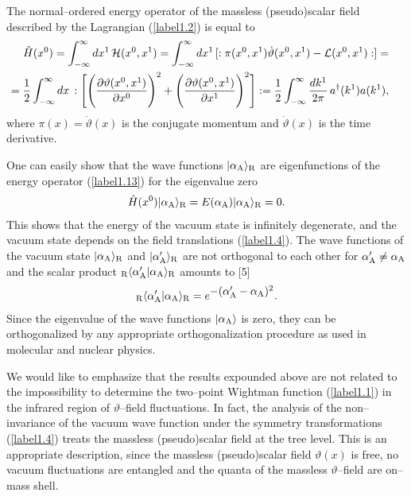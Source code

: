 \documentclass[a4paper,12pt] {article}
\begin{document}
%
The normal--ordered energy operator of the massless (pseudo)scalar
field described by the Lagrangian (\ref{label1.2}) is equal to
%
\begin{eqnarray}\label{label1.13}
\hspace{-0.3in}&&\hat{H}(x^0) = \int^{\infty}_{-\infty}dx^1\,{\cal
H}(x^0,x^1)
=\int^{\infty}_{-\infty}dx^1\,[:\pi(x^0,x^1)\dot{\vartheta}(x^0,x^1)
- {\cal L}(x^0,x^1):] = \nonumber\\ \hspace{-0.3in}&&=
\frac{1}{2}\int^{\infty}_{-\infty}dx\,:\Bigg[\Bigg(\frac{\partial
\vartheta(x^0,x^1)}{\partial x^0}\Bigg)^2 + \Bigg(\frac{\partial
\vartheta(x^0,x^1)}{\partial x^1}\Bigg)^2\Bigg]: =
\frac{1}{2}\int^{\infty}_{-\infty}\frac{dk^1}{2\pi}\,a^{\dagger}(k^1)a(k^1),
\end{eqnarray}
%
where $\pi(x) = \dot{\vartheta}(x)$ is the conjugate momentum and
$\dot{\vartheta}(x)$ is the time derivative.

One can easily show that the wave functions $|\alpha_{\rm
A}\rangle_{\rm R}$ are eigenfunctions of the energy operator
(\ref{label1.13}) for the eigenvalue zero
%
\begin{eqnarray}\label{label1.14}
\hat{H}(x^0)|\alpha_{\rm A}\rangle_{\rm R} = E(\alpha_{\rm
A})|\alpha_{\rm A}\rangle_{\rm R} = 0.
\end{eqnarray}
%
This shows that the energy of the vacuum state is infinitely
degenerate, and the vacuum state depends on the field translations
(\ref{label1.4}). The wave functions of the vacuum state $|\alpha_{\rm
A}\rangle_{\rm R}$ and $|\alpha'_{\rm A}\rangle_{\rm R}$ are not
orthogonal to each other for $\alpha'_{\rm A}\not= \alpha_{\rm A}$ and
the scalar product ${_{\rm R}\langle}\alpha'_{\rm A}|\alpha_{\rm
A}\rangle_{\rm R}$ amounts to [5]
%
\begin{eqnarray}\label{label1.15}
{_{\rm R}\langle}\alpha'_{\rm A}|\alpha_{\rm A}\rangle_{\rm R} =
e^{\textstyle - (\alpha'_{\rm A} - \alpha_{\rm A})^2}.
\end{eqnarray}
%
Since the eigenvalue of the wave functions $|\alpha_{\rm A}\rangle$ is
zero, they can be orthogonalized by any appropriate orthogonalization
procedure as used in molecular and nuclear physics.

We would like to emphasize that the results expounded above are not
related to the impossibility to determine the two--point Wightman
function (\ref{label1.1}) in the infrared region of $\vartheta$--field
fluctuations.  In fact, the analysis of the non--invariance of the
vacuum wave function under the symmetry transformations
(\ref{label1.4}) treats the massless (pseudo)scalar field at the tree
level. This is an appropriate description, since the massless
(pseudo)scalar field $\vartheta(x)$ is free, no vacuum fluctuations are
entangled and the quanta of the massless $\vartheta$--field are
on--mass shell.
\end{document}
